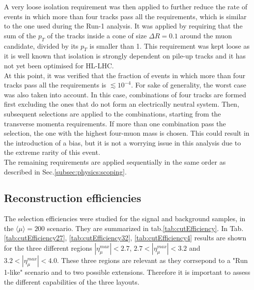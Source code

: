 \documentclass[a4paper,twoside,12pt]{book}
\begin{document}
A very loose isolation requirement was then applied to further reduce the rate of events
in which more than four tracks pass all the requirements, which is similar to the one used during
the Run-1 analysis\cite{HZZ4mu_run1}. It was applied by requiring that the sum of the 
$p_T$ of the tracks inside a cone of size $\Delta R = 0.1$ around the muon
candidate, divided by its $p_T$ is smaller than 1. This requirement was kept loose as 
it is well known that isolation is strongly dependent on pile-up tracks and it has not yet
been optimised for HL-LHC.\\

At this point, it was verified that the fraction of events in which more than four tracks
pass all the requirements is $\lesssim 10^{-4}$. For sake of generality, the worst 
case was also taken into account. In this case, combinations of four tracks are formed
first excluding the ones that do not form an electrically neutral system. Then, subsequent
selections are applied to the combinations, starting from the transverse momenta requirements. If more
than one combination pass the selection, the one with the highest four-muon mass is chosen. 
This could result in the introduction of a bias, but it is not a worrying issue in this analysis due to
the extreme rarity of this event.\\

The remaining requirements are applied sequentially in the same order as described in Sec.\ref{subsec:physics:scoping}.

\subsection{Reconstruction efficiencies}\label{subsec:recoEfficiency}

The selection efficiencies were studied for the signal and background samples, in the $\langle\mu\rangle = 200$ scenario. They are summarized in 
tab.\ref{tab:cutEfficiency}. In Tab.\ref{tab:cutEfficiency27}, \ref{tab:cutEfficiency32}, \ref{tab:cutEfficiency4} results are shown for the three different regions $|\eta_{\mu}^{max}| < 2.7$, 
$2.7 < |\eta_{\mu}^{max}| < 3.2$ and $3.2 < |\eta_{\mu}^{max}| < 4.0$. These three regions are relevant as they corrsepond to a "Run 1-like" scenario and to two possible extensions. Therefore
it is important to assess the different capabilities of the three layouts.\\
\end{document}

